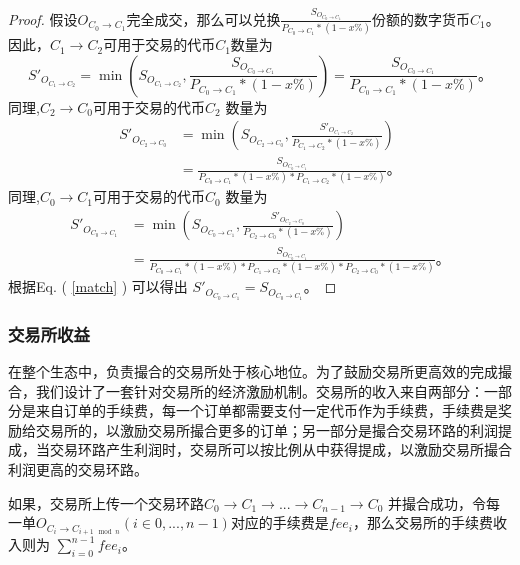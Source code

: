 \documentclass[UTF8,nofonts]{ctexart}
\newtheorem{proof}{证明} [section]
\begin{document}
\begin{proof}
假设$O_{C_{0} \rightarrow C_{1}}$完全成交，那么可以兑换$\frac{S_{O_{C_{0}\rightarrow C_{1}}}}{P_{C_{0} \rightarrow C_{1}}*(1-x\%)}$份额的数字货币$C_{1}$。因此，$C_{1} \rightarrow C_{2}$可用于交易的代币$C_{1}$数量为
$$S'_{O_{C_{1}\rightarrow C_{2}}}=\min(S_{O_{C_{1}\rightarrow C_{2}}},\frac{S_{O_{C_{0}\rightarrow C_{1}}}}{P_{C_{0} \rightarrow C_{1}}*(1-x\%)})=\frac{S_{O_{C_{0}\rightarrow C_{1}}}}{P_{C_{0} \rightarrow C_{1}}*(1-x\%)}\text{。}$$
同理,$C_{2} \rightarrow C_{0}$可用于交易的代币$C_{2}$ 数量为
\[ \begin{split}
S'_{O_{C_{2}\rightarrow C_{0}}}&=\min(S_{O_{C_{2}\rightarrow C_{0}}},\frac{S'_{O_{C_{1}\rightarrow C_{2}}}}{P_{C_{1} \rightarrow C_{2}}*(1-x\%)})\\
&=\frac{S_{O_{C_{0}\rightarrow C_{1}}}}{P_{C_{0} \rightarrow C_{1}}*(1-x\%)*P_{C_{1} \rightarrow C_{2}}*(1-x\%)}\text{。}
\end{split} \]
同理,$C_{0} \rightarrow C_{1}$可用于交易的代币$C_{0}$ 数量为
\[ \begin{split}
S'_{O_{C_{0}\rightarrow C_{1}}}&=\min(S_{O_{C_{0}\rightarrow C_{1}}},\frac{S'_{O_{C_{2}\rightarrow C_{0}}}}{P_{C_{2} \rightarrow C_{0}}*(1-x\%)})\\
&=\frac{S_{O_{C_{0}\rightarrow C_{1}}}}{P_{C_{0} \rightarrow C_{1}}*(1-x\%)*P_{C_{1} \rightarrow C_{2}}*(1-x\%)*P_{C_{2} \rightarrow C_{0}}*(1-x\%)}\text{。}
\end{split} \]
根据Eq. ( \ref{match} ) 可以得出 $S'_{O_{C_{0}\rightarrow C_{1}}}=S_{O_{C_{0}\rightarrow C_{1}}}$。
\end{proof}

\subsubsection{交易所收益}
在整个生态中，负责撮合的交易所处于核心地位。为了鼓励交易所更高效的完成撮合，我们设计了一套针对交易所的经济激励机制。交易所的收入来自两部分：一部分是来自订单的手续费，每一个订单都需要支付一定代币作为手续费，手续费是奖励给交易所的，以激励交易所撮合更多的订单；另一部分是撮合交易环路的利润提成，当交易环路产生利润时，交易所可以按比例从中获得提成，以激励交易所撮合利润更高的交易环路。

如果，交易所上传一个交易环路$C_0 \rightarrow C_1 \rightarrow ... \rightarrow C_{n-1} \rightarrow C_{0}$ 并撮合成功，令每一单$O_{C_{i}\rightarrow C_{i+1\mod n}}$$(i\in{0,...,n-1})$对应的手续费是$fee_{i}$，那么交易所的手续费收入则为
$
\sum^{n-1}_{i=0}fee_{i}\text{。}
$
\end{document}
